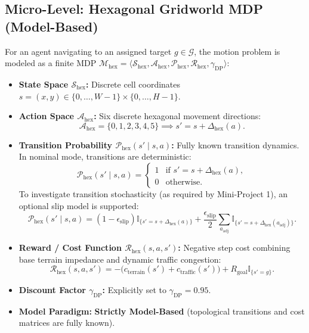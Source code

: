 \documentclass[11pt,a4paper]{article}
\begin{document}
\subsection{Micro-Level: Hexagonal Gridworld MDP (Model-Based)}
For an agent navigating to an assigned target $g \in \mathcal{G}$, the motion problem is modeled as a finite MDP $\mathcal{M}_{\text{hex}} = \langle \mathcal{S}_{\text{hex}}, \mathcal{A}_{\text{hex}}, \mathcal{P}_{\text{hex}}, \mathcal{R}_{\text{hex}}, \gamma_{\text{DP}} \rangle$:
\begin{itemize}
    \item \textbf{State Space $\mathcal{S}_{\text{hex}}$:} Discrete cell coordinates $s = (x, y) \in \{0, \dots, W-1\} \times \{0, \dots, H-1\}$.
    \item \textbf{Action Space $\mathcal{A}_{\text{hex}}$:} Six discrete hexagonal movement directions:
    \begin{equation}
        \mathcal{A}_{\text{hex}} = \{0, 1, 2, 3, 4, 5\} \implies s' = s + \Delta_{\text{hex}}(a).
    \end{equation}
    \item \textbf{Transition Probability $\mathcal{P}_{\text{hex}}(s' \mid s, a)$:} Fully known transition dynamics. In nominal mode, transitions are deterministic:
    \begin{equation}
        \mathcal{P}_{\text{hex}}(s' \mid s, a) = 
        \begin{cases} 
            1 & \text{if } s' = s + \Delta_{\text{hex}}(a), \\ 
            0 & \text{otherwise.} 
        \end{cases}
    \end{equation}
    To investigate transition stochasticity (as required by Mini-Project 1), an optional slip model is supported:
    \begin{equation}
        \mathcal{P}_{\text{hex}}(s' \mid s, a) = (1 - \epsilon_{\text{slip}}) \mathbb{I}_{\{s' = s + \Delta_{\text{hex}}(a)\}} + \frac{\epsilon_{\text{slip}}}{2} \sum_{a_{\text{adj}}} \mathbb{I}_{\{s' = s + \Delta_{\text{hex}}(a_{\text{adj}})\}}.
    \end{equation}
    \item \textbf{Reward / Cost Function $\mathcal{R}_{\text{hex}}(s, a, s')$:} Negative step cost combining base terrain impedance and dynamic traffic congestion:
    \begin{equation}
        \mathcal{R}_{\text{hex}}(s, a, s') = - \Big( c_{\text{terrain}}(s') + c_{\text{traffic}}(s') \Big) + R_{\text{goal}} \mathbb{I}_{\{s' = g\}}.
    \end{equation}
    \item \textbf{Discount Factor $\gamma_{\text{DP}}$:} Explicitly set to $\gamma_{\text{DP}} = 0.95$.
    \item \textbf{Model Paradigm:} \textbf{Strictly Model-Based} (topological transitions and cost matrices are fully known).
\end{itemize}
\end{document}
